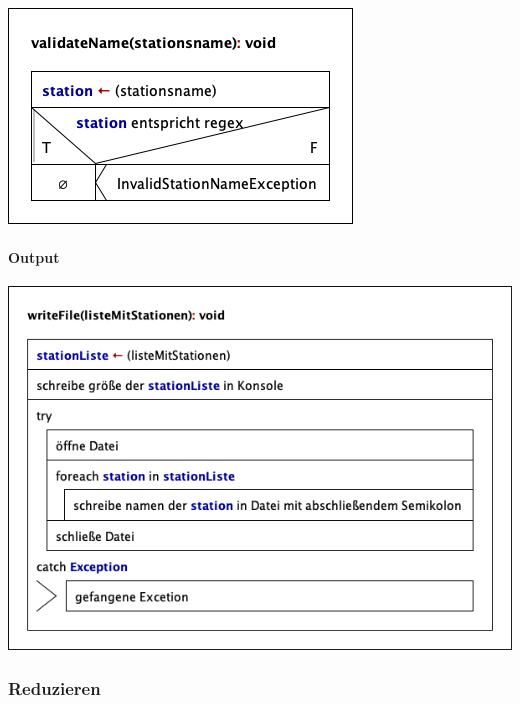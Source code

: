 \begin{center}
    \includegraphics[width=\linewidth]{images/Struktogramme/io/validateName.png}
    \label{pro:subsubsecpar:namen-validator}
\end{center}


\paragraph{Output}\label{pro:subsubsecpar:output}
\begin{center}
    \includegraphics[width=\linewidth]{images/Struktogramme/io/writeFile.png}
    \label{pro:subsubsecpar:namen-validator}
\end{center}


\newpage
\subsubsection{Reduzieren}\label{pro:subsubsec:reduzieren}
